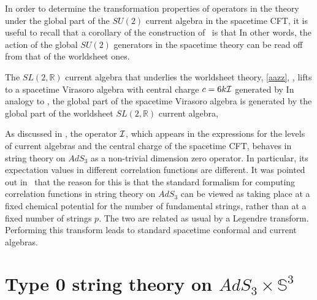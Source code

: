 \documentclass[12pt]{article}
\def\sltwo{\ensuremath{SL(2,\bR)}}
\def\[{\left[}
\newcommand{\bR}{{\mathbb R}}
\newcommand{\bS}{{\mathbb S}}
\numberwithin{equation}{section}
\begin{document}
In order to determine the transformation properties of operators in the theory under the global part of the $SU(2)$ current algebra in the spacetime CFT, it is useful to recall that a corollary of the construction of~ is that 
In other words, the action of the global $SU(2)$ generators in the spacetime theory can be read off from that of the worldsheet ones.

The $\sltwo$ current algebra that underlies the worldsheet theory, \eqref{aazz}, \bbaa, lifts to a spacetime Virasoro algebra with central charge $c=6k\mathcal {I}$ generated by
In analogy to \ointwssp, the global part of the spacetime Virasoro algebra is generated by the global part of the worldsheet $\sltwo$ current algebra, 



\noindent
As discussed in , the operator $\mathcal {I}$, which appears in the expressions for the levels of current algebras and the central charge of the spacetime CFT, behaves in string theory on $AdS_3$ as a non-trivial dimension zero operator. In particular, its expectation values in different correlation functions are different. It was pointed out in~ that the reason for this is that the standard formalism for computing correlation functions in string theory on $AdS_3$ can be viewed as taking place at a fixed chemical potential for the number of fundamental strings, rather than at a fixed number of strings $p$. The two are related as usual by a Legendre transform. Performing this transform leads to standard spacetime conformal and current algebras. 








\section{Type 0 string theory on \texorpdfstring{$AdS_3\times \bS^3$}{}}
\label{sec:type0short}
\end{document}
